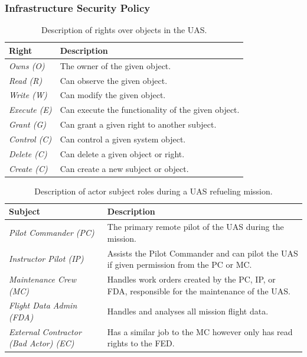 \documentclass[10pt,journal,compsoc]{IEEEtran}
\begin{document}
\subsubsection{Infrastructure Security Policy}

\begin{table}[]
  \caption{Description of rights over objects in the UAS.}
  \begin{tabular}{ll}
  \hline
  \textbf{Right}       & \textbf{Description}                               \\ 
  \hline
  \textit{Owns (O)}    & The owner of the given object.                     \\
  \textit{Read (R)}    & Can observe the given object.                      \\
  \textit{Write (W)}   & Can modify the given object.                       \\
  \textit{Execute (E)} & Can execute the functionality of the given object. \\
  \textit{Grant (G)}   & Can grant a given right to another subject.        \\
  \textit{Control (C)} & Can control a given system object.                 \\
  \textit{Delete (C)}  & Can delete a given object or right.                 \\
  \textit{Create (C)}  & Can create a new subject or object.                 \\
  \end{tabular}
\end{table}

\begin{table}[]
  \caption{Description of actor subject roles during a UAS refueling mission.}
  \begin{tabular}{ll}
  \hline
  \textbf{Subject}                           & \textbf{Description}                                                                                       \\ 
  \hline
  \textit{Pilot Commander (PC)}                  & The primary remote pilot of the UAS during the mission.                                                    \\
  \textit{Instructor Pilot (IP)}                 & Assists the Pilot Commander and can pilot the UAS if given permission from the PC or MC.                   \\
  \textit{Maintenance Crew (MC)}                 & Handles work orders created by the PC, IP, or FDA, responsible for the maintenance of the UAS.             \\
  \textit{Flight Data Admin (FDA)}               & Handles and analyses all mission flight data.                                                              \\
  \textit{External Contractor (Bad Actor) (EC)}  & Has a similar job to the MC however only has read rights to the FED.                                       \\
  \end{tabular}
\end{table}
\end{document}

